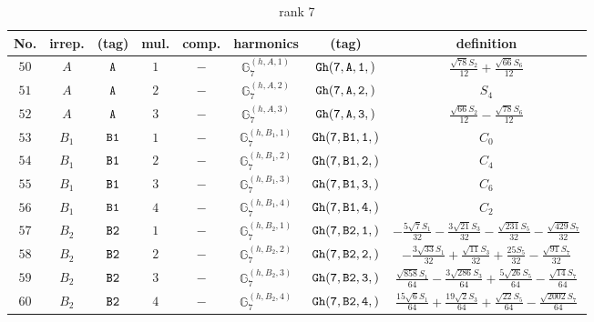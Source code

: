 \documentclass[fleqn,8pt]{jsarticle}
\begin{document}
\begin{table}[ht!]
\begin{center}
\caption{rank 7}
\renewcommand{\arraystretch}{1.3}
\begin{tabular}{cccccccc} \hline \hline
No. & irrep. & (tag) & mul. & comp. & harmonics & (tag) & definition \\ \hline
$ 50 $ & $ A $ & $ {\tt A} $ & $ 1 $ & $ - $ & $ \mathbb{G}_{7}^{(h,A,1)} $ & $ {\tt Gh(7,A,1,)} $ & $ \frac{\sqrt{78} S_{2}}{12} + \frac{\sqrt{66} S_{6}}{12} $ \\
$ 51 $ & $ A $ & $ {\tt A} $ & $ 2 $ & $ - $ & $ \mathbb{G}_{7}^{(h,A,2)} $ & $ {\tt Gh(7,A,2,)} $ & $ S_{4} $ \\
$ 52 $ & $ A $ & $ {\tt A} $ & $ 3 $ & $ - $ & $ \mathbb{G}_{7}^{(h,A,3)} $ & $ {\tt Gh(7,A,3,)} $ & $ \frac{\sqrt{66} S_{2}}{12} - \frac{\sqrt{78} S_{6}}{12} $ \\
$ 53 $ & $ B_{1} $ & $ {\tt B1} $ & $ 1 $ & $ - $ & $ \mathbb{G}_{7}^{(h,B_{1},1)} $ & $ {\tt Gh(7,B1,1,)} $ & $ C_{0} $ \\
$ 54 $ & $ B_{1} $ & $ {\tt B1} $ & $ 2 $ & $ - $ & $ \mathbb{G}_{7}^{(h,B_{1},2)} $ & $ {\tt Gh(7,B1,2,)} $ & $ C_{4} $ \\
$ 55 $ & $ B_{1} $ & $ {\tt B1} $ & $ 3 $ & $ - $ & $ \mathbb{G}_{7}^{(h,B_{1},3)} $ & $ {\tt Gh(7,B1,3,)} $ & $ C_{6} $ \\
$ 56 $ & $ B_{1} $ & $ {\tt B1} $ & $ 4 $ & $ - $ & $ \mathbb{G}_{7}^{(h,B_{1},4)} $ & $ {\tt Gh(7,B1,4,)} $ & $ C_{2} $ \\
$ 57 $ & $ B_{2} $ & $ {\tt B2} $ & $ 1 $ & $ - $ & $ \mathbb{G}_{7}^{(h,B_{2},1)} $ & $ {\tt Gh(7,B2,1,)} $ & $ - \frac{5 \sqrt{7} S_{1}}{32} - \frac{3 \sqrt{21} S_{3}}{32} - \frac{\sqrt{231} S_{5}}{32} - \frac{\sqrt{429} S_{7}}{32} $ \\
$ 58 $ & $ B_{2} $ & $ {\tt B2} $ & $ 2 $ & $ - $ & $ \mathbb{G}_{7}^{(h,B_{2},2)} $ & $ {\tt Gh(7,B2,2,)} $ & $ - \frac{3 \sqrt{33} S_{1}}{32} + \frac{\sqrt{11} S_{3}}{32} + \frac{25 S_{5}}{32} - \frac{\sqrt{91} S_{7}}{32} $ \\
$ 59 $ & $ B_{2} $ & $ {\tt B2} $ & $ 3 $ & $ - $ & $ \mathbb{G}_{7}^{(h,B_{2},3)} $ & $ {\tt Gh(7,B2,3,)} $ & $ \frac{\sqrt{858} S_{1}}{64} - \frac{3 \sqrt{286} S_{3}}{64} + \frac{5 \sqrt{26} S_{5}}{64} - \frac{\sqrt{14} S_{7}}{64} $ \\
$ 60 $ & $ B_{2} $ & $ {\tt B2} $ & $ 4 $ & $ - $ & $ \mathbb{G}_{7}^{(h,B_{2},4)} $ & $ {\tt Gh(7,B2,4,)} $ & $ \frac{15 \sqrt{6} S_{1}}{64} + \frac{19 \sqrt{2} S_{3}}{64} + \frac{\sqrt{22} S_{5}}{64} - \frac{\sqrt{2002} S_{7}}{64} $ \\

\end{tabular}
\end{center}
\end{table}
\end{document}
